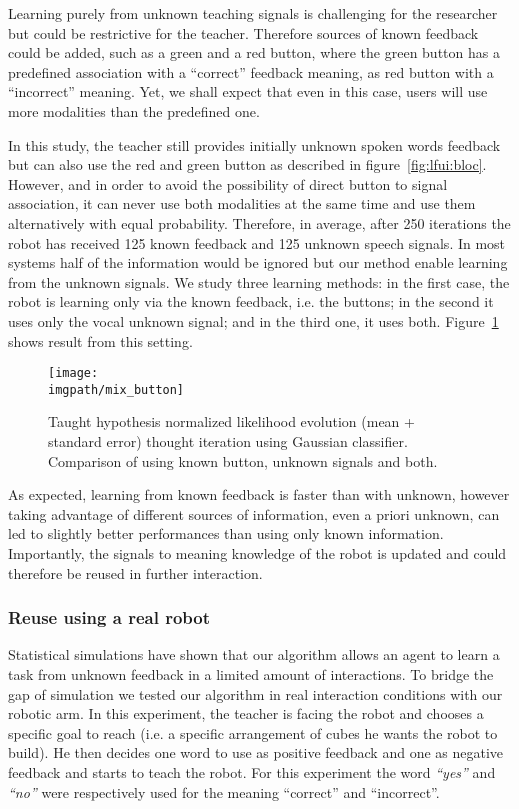 Learning purely from unknown teaching signals is challenging for the researcher but could be restrictive for the teacher. Therefore sources of known feedback could be added, such as a green and a red button, where the green button has a predefined association with a ``correct'' feedback meaning, as red button with a ``incorrect'' meaning. Yet, we shall expect that even in this case, users will use more modalities than the predefined one.  

In this study, the teacher still provides initially unknown spoken words feedback but can also use the red and green button as described in figure~\ref{fig:lfui:bloc}. However, and in order to avoid the possibility of direct button to signal association, it can never use both modalities at the same time and use them alternatively with equal probability. Therefore, in average, after 250 iterations the robot has received 125 known feedback and 125 unknown speech signals. In most systems half of the information would be ignored but our method enable learning from the unknown signals. We study three learning methods: in the first case, the robot is learning only via the known feedback, i.e. the buttons; in the second it uses only the vocal unknown signal; and in the third one, it uses both. Figure~\ref{fig:button} shows result from this setting. 

\begin{figure}[!ht]
  \centering
  \texttt{[image: \\imgpath/mix\_button]}
  \caption{Taught hypothesis normalized likelihood evolution (mean + standard error) thought iteration using Gaussian classifier. Comparison of using known button, unknown signals and both.}
  \label{fig:button}
\end{figure}

As expected, learning from known feedback is faster than with unknown, however taking advantage of different sources of information, even a priori unknown, can led to slightly better performances than using only known information. Importantly, the signals to meaning knowledge of the robot is updated and could therefore be reused in further interaction.

\subsubsection{Reuse using a real robot}

Statistical simulations have shown that our algorithm allows an agent to learn a task from unknown feedback in a limited amount of interactions. To bridge the gap of simulation we tested our algorithm in real interaction conditions with our robotic arm. In this experiment, the teacher is facing the robot and chooses a specific goal to reach (i.e. a specific arrangement of cubes he wants the robot to build). He then decides one word to use as positive feedback and one as negative feedback and starts to teach the robot. For this experiment the word \textit{``yes''} and \textit{``no''} were respectively used for the meaning ``correct'' and ``incorrect''. 

